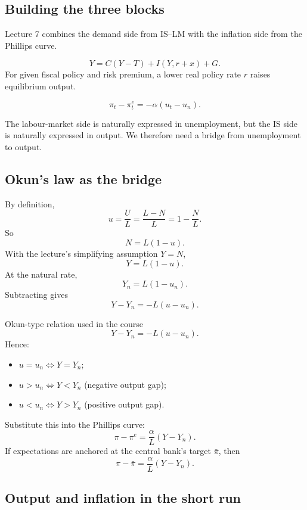 \documentclass[12pt]{article}
\begin{document}
\subsection{Building the three blocks}

Lecture 7 combines the demand side from IS--LM with the inflation side from the Phillips curve.

\begin{keyformula}[title={Key Formula: IS relation used in Lecture 7}]
\[
Y=C(Y-T)+I(Y,r+x)+G.
\]
For given fiscal policy and risk premium, a lower real policy rate $r$ raises equilibrium output.
\end{keyformula}

\begin{keyformula}[title={Key Formula: Phillips curve in unemployment form}]
\[
\pi_t-\pi_t^e=-\alpha(u_t-u_n).
\]
\end{keyformula}

The labour-market side is naturally expressed in unemployment, but the IS side is naturally expressed in output. We therefore need a bridge from unemployment to output.

\subsection{Okun's law as the bridge}

By definition,
\[
u=\frac{U}{L}=\frac{L-N}{L}=1-\frac{N}{L}.
\]
So
\[
N=L(1-u).
\]
With the lecture's simplifying assumption $Y=N$,
\[
Y=L(1-u).
\]
At the natural rate,
\[
Y_n=L(1-u_n).
\]
Subtracting gives
\[
Y-Y_n=-L(u-u_n).
\]

\begin{theorem}{Okun-type relation used in the course}{}
\[
Y-Y_n=-L(u-u_n).
\]
Hence:
\begin{itemize}[leftmargin=1.5em]
\item $u=u_n \iff Y=Y_n$;
\item $u>u_n \iff Y<Y_n$ (negative output gap);
\item $u<u_n \iff Y>Y_n$ (positive output gap).
\end{itemize}
\end{theorem}

Substitute this into the Phillips curve:
\[
\pi-\pi^e=\frac{\alpha}{L}(Y-Y_n).
\]
If expectations are anchored at the central bank's target $\bar{\pi}$, then
\[
\pi-\bar{\pi}=\frac{\alpha}{L}(Y-Y_n).
\]

\subsection{Output and inflation in the short run}
\end{document}
